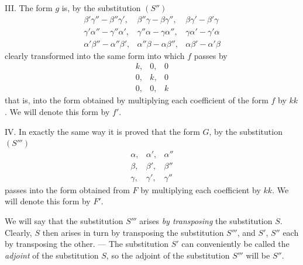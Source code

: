 III. The form $g$ is, by the substitution $(S'')$
\[
\begin{array}{ccc}
\beta'\gamma''-\beta''\gamma', & \beta''\gamma-\beta\gamma'', & \beta\gamma'-\beta'\gamma \\
\gamma'\alpha''-\gamma''\alpha', & \gamma''\alpha-\gamma\alpha'', & \gamma\alpha'-\gamma'\alpha \\
\alpha'\beta''-\alpha''\beta', & \alpha''\beta-\alpha\beta'', & \alpha\beta'-\alpha'\beta
\end{array}
\]
clearly transformed into the same form into which $f$ passes by
\[
\begin{array}{ccc}
k, & 0, & 0 \\
0, & k, & 0 \\
0, & 0, & k
\end{array}
\]
that is, into the form obtained by multiplying each coefficient of the form $f$ by $kk$. We will denote this form by $f'$.

IV. In exactly the same way it is proved that the form $G$, by the substitution
$(S''')$
\[
\begin{array}{ccc}
\alpha, & \alpha', & \alpha'' \\
\beta, & \beta', & \beta'' \\
\gamma, & \gamma', & \gamma''
\end{array}
\]
passes into the form obtained from $F$ by multiplying each coefficient by $kk$. We will denote this form by $F'$.

We will say that the substitution $S'''$ arises \textit{by transposing} the substitution $S$. Clearly, $S$ then arises in turn by transposing the substitution $S'''$, and $S'$, $S''$ each by transposing the other. --- The substitution $S'$ can conveniently be called the \textit{adjoint} of the substitution $S$, so the adjoint of the substitution $S'''$ will be $S''$.

